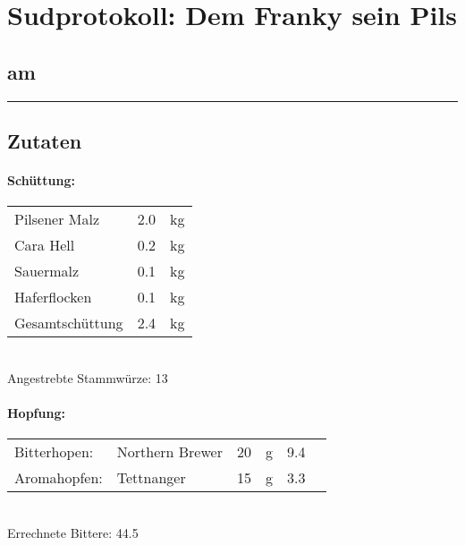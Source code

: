 \documentclass[12pt,oneside,a4paper]{scrartcl}
\begin{document}
	\begin{minipage}[c]{0.70\textwidth}
		\section*{\hspace{-.4cm}Sudprotokoll: Dem Franky sein Pils}
	\end{minipage}
	\begin{minipage}[c]{0.29\textwidth}
		\subsection*{am }
	\end{minipage}
	\rule{\textwidth}{2pt}
%
\subsection*{Zutaten}
%
\paragraph{Schüttung:}
	\begin{tabular}[t]{m{8cm} m{2cm} m{1cm}}
		Pilsener Malz & \num{2,0} & \si{\kilogram} \bigstrut\\
		Cara Hell & \num{0,2} & \si{\kilogram} \bigstrut\\
		Sauermalz & \num{0,1} & \si{\kilogram} \bigstrut\\
		Haferflocken & \num{0,1} & \si{\kilogram} \bigstrut\\\hline\hline
		Gesamtschüttung & \num{2,4} & \si{\kilogram} \bigstrut
	\end{tabular}\\

\vspace{.25cm}
\hspace{1cm}Angestrebte Stammwürze: \SI{13}{\plato}
%
\paragraph{Hopfung:}
	\begin{tabular}[t]{m{2.5cm} m{5cm} m{0.5cm} m{1cm} m{0.5cm} m{1cm}}
		Bitterhopen: & Northern Brewer & \num{20} & \si{\gram} & \num{9,4} & \si{\peralpha} \\
		Aromahopfen: & Tettnanger &\num{15} & \si{\gram} & \num{3,3} &  \si{\peralpha}
	\end{tabular}\\

\vspace{.25cm}
\hspace{1cm}Errechnete Bittere: \SI{44,5}{\ibu}
%
\end{document}
